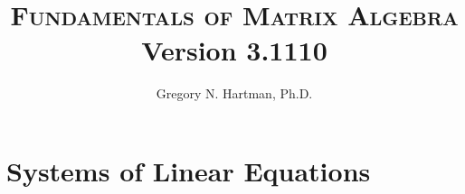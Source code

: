 \documentclass[10pt]{book}
\newcommand{\versionnum}{3.1110}
\begin{document}


\printincolor


\drawexamplelines

\printallanswers


\normalem

\sffamily





\clearpage
\thispagestyle{empty}
\frontmatter

\title{\textsc{Fundamentals of Matrix Algebra}\\
{\small Version \versionnum}}
\author{Gregory N. Hartman, Ph.D.}
\date{}



\thispagestyle{empty}
\clearpage


\thispagestyle{empty}


\cleardoublepage
{}

\clearpage{\pagestyle{empty}\cleardoublepage}

\clearpage{\pagestyle{empty}\cleardoublepage}

\tableofcontents
\clearpage{\pagestyle{empty}\cleardoublepage}

\mainmatter







\chapter{Systems of Linear Equations}\label{chapter:linear}
\thispagestyle{empty}








\end{document}
